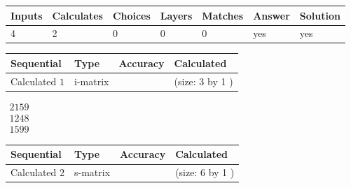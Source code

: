 \documentclass[12pt]{article}
\begin{document}
 
 
\noindent{}
 
 

 
 
 
\noindent{}
 
 

 
 
\noindent{}
 
 

 
\vspace{0.3in}
   
   
   
   
\noindent\begin{tabular}{|l|l|l|l|l|l|l|}
 \hline
Inputs & Calculates & Choices & Layers & Matches & Answer & Solution \\ \hline
 4  & 
 2  & 
 0
  & 
 0  & 
 0  & 
  yes & 
  yes 
  \\ \hline
 \end{tabular}
   
   
   
   
\noindent{}
   
   
  
  
\noindent\begin{tabular}{|l|l|l|l|}
\hline
 Sequential & Type & Accuracy & Calculated \\ 
\hline
 
 
  Calculated $  1 $ & i-matrix &  & 
 (size:  3  by  1 )
 \\  \hline  
 \end{tabular}
   
   
$\begin{array}{
 c
 }
 2159  \\ 
 1248  \\ 
 1599
 \end{array}  $ 
  
  
\noindent\begin{tabular}{|l|l|l|l|}
\hline
 Sequential & Type & Accuracy & Calculated \\ 
\hline
 
 
  Calculated $  2 $ & s-matrix & & 
 (size:  6  by  1 )
 \\  \hline  
 \end{tabular}
   
\end{document}
